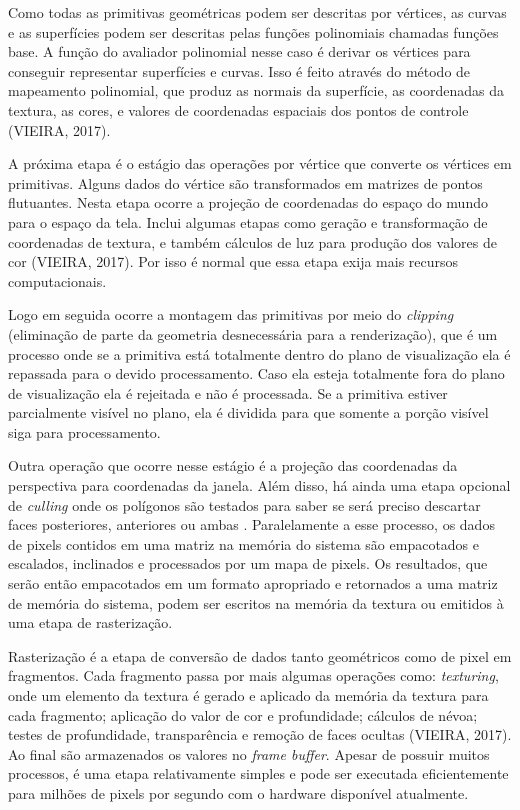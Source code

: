 Como todas as primitivas geométricas podem ser descritas por vértices, as curvas e as superfícies podem ser descritas pelas funções polinomiais chamadas funções base. A função do avaliador polinomial nesse caso é derivar os vértices para conseguir representar superfícies e curvas. Isso é feito através do método de mapeamento polinomial, que produz as normais da superfície, as coordenadas da textura, as cores, e valores de coordenadas espaciais dos pontos de controle (VIEIRA, 2017)\nocite{pipelnRef}.

A próxima etapa é o estágio das operações por vértice que converte os vértices em primitivas. Alguns dados do vértice são transformados em matrizes de pontos flutuantes. Nesta etapa ocorre a projeção de coordenadas do espaço do mundo para o espaço da tela. Inclui algumas etapas como geração e transformação de coordenadas de textura, e também cálculos de luz para produção dos valores de cor (VIEIRA, 2017). Por isso é normal que essa etapa exija mais recursos computacionais. 

Logo em seguida ocorre a montagem das primitivas por meio do \textit{clipping} (eliminação de parte da geometria desnecessária para a renderização), que é um processo onde se a primitiva está totalmente dentro do plano de visualização ela é repassada para o devido processamento. Caso ela esteja totalmente fora do plano de visualização ela é rejeitada e não é processada. Se a primitiva estiver parcialmente visível no plano, ela é dividida para que somente a porção visível siga para processamento.

Outra operação que ocorre nesse estágio é a projeção das coordenadas da perspectiva para coordenadas da janela. Além disso, há ainda uma etapa opcional de \textit{culling} onde os polígonos são testados para saber se será preciso descartar faces posteriores, anteriores ou ambas \cite{GLSLBook}. Paralelamente a esse processo, os dados de pixels contidos em uma matriz na memória do sistema são empacotados e escalados, inclinados e processados por um mapa de pixels. Os resultados, que serão então empacotados em um formato apropriado e retornados a uma matriz de memória do sistema, podem ser escritos na memória da textura ou emitidos à uma etapa de rasterização.

Rasterização é a etapa de conversão de dados tanto geométricos como de pixel em fragmentos. Cada fragmento passa por mais algumas operações como: \textit{texturing}, onde um elemento da textura é gerado e aplicado da memória da textura para cada fragmento; aplicação do valor de cor e profundidade; cálculos de névoa; testes de profundidade, transparência e remoção de faces ocultas (VIEIRA, 2017). Ao final são armazenados os valores no \textit{frame buffer}. Apesar de possuir muitos processos, é uma etapa relativamente simples e pode ser executada eficientemente para milhões de pixels por segundo com o hardware disponível atualmente.

